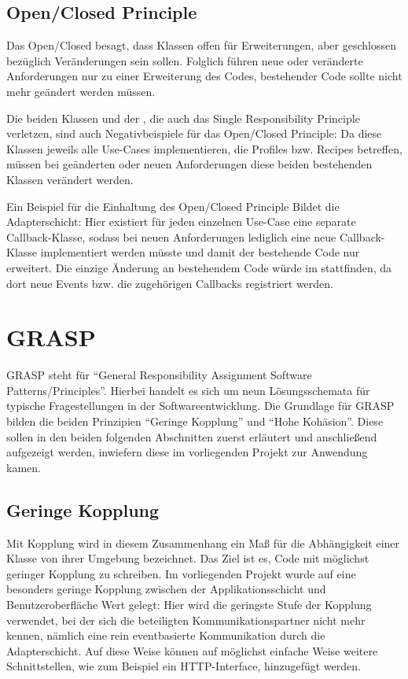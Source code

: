 \subsection{Open/Closed Principle}
Das Open/Closed besagt, dass Klassen offen für Erweiterungen, aber geschlossen bezüglich Veränderungen sein sollen. Folglich führen neue oder veränderte Anforderungen nur zu einer Erweiterung des Codes, bestehender Code sollte nicht mehr geändert werden müssen.

Die beiden Klassen  und der , die auch das Single Responsibility Principle verletzen, sind auch Negativbeispiele für das Open/Closed Principle: Da diese Klassen jeweils alle Use-Cases implementieren, die Profiles bzw. Recipes betreffen, müssen bei geänderten oder neuen Anforderungen diese beiden bestehenden Klassen verändert werden.

Ein Beispiel für die Einhaltung des Open/Closed Principle Bildet die Adapterschicht: Hier existiert für jeden einzelnen Use-Case eine separate Callback-Klasse, sodass bei neuen Anforderungen lediglich eine neue Callback-Klasse implementiert werden müsste und damit der bestehende Code nur erweitert. Die einzige Änderung an bestehendem Code würde im  stattfinden, da dort neue Events bzw. die zugehörigen Callbacks registriert werden.

\section{GRASP}
GRASP steht für \enquote{General Responsibility Assignment Software Patterns/Principles}. Hierbei handelt es sich um neun Lösungsschemata für typische Fragestellungen in der Softwareentwicklung. Die Grundlage für GRASP bilden die beiden Prinzipien \enquote{Geringe Kopplung} und \enquote{Hohe Kohäsion}. Diese sollen in den beiden folgenden Abschnitten zuerst erläutert und anschließend aufgezeigt werden, inwiefern diese im vorliegenden Projekt zur Anwendung kamen.

\subsection{Geringe Kopplung}
Mit Kopplung wird in diesem Zusammenhang ein Maß für die Abhängigkeit einer Klasse von ihrer Umgebung bezeichnet. Das Ziel ist es, Code mit möglichst geringer Kopplung zu schreiben. Im vorliegenden Projekt wurde auf eine besonders geringe Kopplung zwischen der Applikationsschicht und Benutzeroberfläche Wert gelegt: Hier wird die geringste Stufe der Kopplung verwendet, bei der sich die beteiligten Kommunikationspartner nicht mehr kennen, nämlich eine rein eventbasierte Kommunikation durch die Adapterschicht. Auf diese Weise können auf möglichst einfache Weise weitere Schnittstellen, wie zum Beispiel ein HTTP-Interface, hinzugefügt werden.

